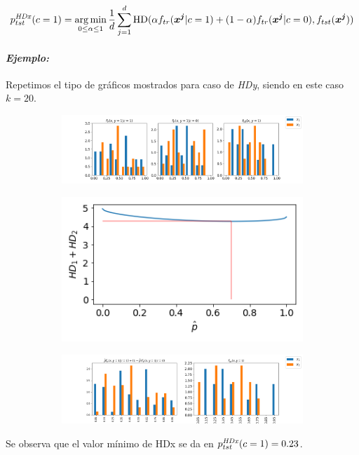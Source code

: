 \begin{equation}\label{ecuacion:hdx}
    p^{\it HDx \/}_{tst}(c=1) = \operatorname*{arg\,min}_{0 \leq \alpha \leq 1}{\frac{1}{d}\sum \limits_{j=1}^{d} \text{HD}}(\alpha f_{tr}({\boldsymbol{x^j}|c=1})+(1-\alpha) f_{tr}({\boldsymbol{x^j}|c=0}), f_{tst}({\boldsymbol{x^j}}))
\end{equation}

\paragraph{\it Ejemplo:\/} Repetimos el tipo de gráficos mostrados para  caso de
{\it HDy\/}, siendo en este caso $k=20$.

\begin{figure}[h]
    \centering
    \begin{subfigure}[b]{\textwidth}
        \centering
        \includegraphics[width=\linewidth]{../plots_teoria/hdx_1.png}
    \end{subfigure}
    \begin{subfigure}[b]{0.4\textwidth}
        \centering
        \includegraphics[width=\linewidth]{../plots_teoria/hdx_2.png}
    \end{subfigure}
    \begin{subfigure}[b]{\textwidth}
        \centering
        \includegraphics[width=\linewidth]{../plots_teoria/hdx_3.png}
    \end{subfigure}
    \hfill
\end{figure}

Se observa que el valor mínimo de HDx se da en $p^{\it HDx \/}_{tst}(c=1) =
0.23$.
